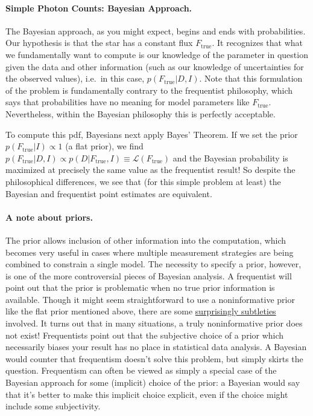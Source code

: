 \documentclass[%
oneside,                 %
final,                   %
10pt]{article}
\begin{document}
\paragraph{Simple Photon Counts: Bayesian Approach.}
The Bayesian approach, as you might expect, begins and ends with probabilities. Our hypothesis is that the star has a constant flux $F_\mathrm{true}$. It recognizes that what we fundamentally want to compute is our knowledge of the parameter in question given the data and other information (such as our knowledge of uncertainties for the observed values), i.e.~in this case, $p(F_\mathrm{true} | D,I)$.
Note that this formulation of the problem is fundamentally contrary to the frequentist philosophy, which says that probabilities have no meaning for model parameters like $F_\mathrm{true}$. Nevertheless, within the Bayesian philosophy this is perfectly acceptable.

To compute this pdf, Bayesians next apply Bayes' Theorem.
If we set the prior $p(F_\mathrm{true}|I) \propto 1$ (a flat prior), we find
$p(F_\mathrm{true}|D,I) \propto p(D | F_\mathrm{true},I) \equiv \mathcal{L}(F_\mathrm{true})$
and the Bayesian probability is maximized at precisely the same value as the frequentist result! So despite the philosophical differences, we see that (for this simple problem at least) the Bayesian and frequentist point estimates are equivalent.

\paragraph{A note about priors.}
The prior allows inclusion of other information into the computation, which becomes very useful in cases where multiple measurement strategies are being combined to constrain a single model. The necessity to specify a prior, however, is one of the more controversial pieces of Bayesian analysis.
A frequentist will point out that the prior is problematic when no true prior information is available. Though it might seem straightforward to use a noninformative prior like the flat prior mentioned above, there are some \href{{http://normaldeviate.wordpress.com/2013/07/13/lost-causes-in-statistics-ii-noninformative- priors/comment-page-1/}}{surprisingly subtleties} involved. It turns out that in many situations, a truly noninformative prior does not exist! Frequentists point out that the subjective choice of a prior which necessarily biases your result has no place in statistical data analysis.
A Bayesian would counter that frequentism doesn't solve this problem, but simply skirts the question. Frequentism can often be viewed as simply a special case of the Bayesian approach for some (implicit) choice of the prior: a Bayesian would say that it's better to make this implicit choice explicit, even if the choice might include some subjectivity.
\end{document}
